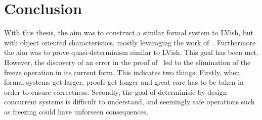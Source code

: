 \section{Conclusion}%
\label{sec:conclusion}

With this thesis, the aim was to construct a similar formal system to LVish, but
with object oriented characteristics, mostly levaraging the work
of~\textcite{conf/oopsla/HallerL16}. Furthermore the aim was to prove
quasi-determinism similar to LVish. This goal has been met.  However, the
discovery of an error in the proof of~\textcite{kuper2014freezeTR} led to the
elimination of the freeze operation in its current form. This indicates two
things: Firstly, when formal systems get larger, proofs get longer and great
care has to be taken in order to ensure correctness. Secondly, the goal of
determinisic-by-design concurrent systems is difficult to understand, and
seemingly safe operations such as freezing could have unforseen consequences.





